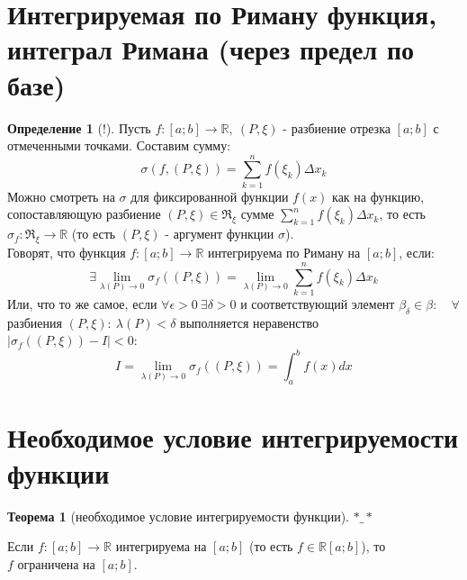 \documentclass{report}
\theoremstyle{definition}
\newtheorem*{definition}{Определение}
\newtheorem*{theorem}{Теорема}
\begin{document}
\section{Интегрируемая по Риману функция, интеграл Римана (через предел по базе)}

\begin{definition}[!]
    Пусть $f:[a;b]\rightarrow\mathbb{R}, \ (P,\xi)$ - разбиение отрезка $[a;b]$ с отмеченными точками. Составим сумму:
    \begin{equation*}
        \sigma(f,(P,\xi)) = \sum_{k=1}^{n}f(\xi_{k})\Delta x_{k}
    \end{equation*}
    Можно смотреть на $\sigma$ для фиксированной функции $f(x)$ как на функцию, сопоставляющую разбиение $(P,\xi)\in
        \Re_{\xi}$ сумме $\sum_{k=1}^{n}f(\xi_{k})\Delta x_{k}$, то есть $\sigma_{f}:\Re_{\xi}\rightarrow\mathbb{R}$
    (то есть $(P,\xi)$ - аргумент функции $\sigma$).\\

    Говорят, что функция $f:[a;b]\rightarrow\mathbb{R}$ интегрируема по Риману на $[a;b]$, если:
    \begin{equation*}
        \exists\underset{\lambda(P)\rightarrow0}{\lim}\sigma_{f}((P,\xi)) = \underset{\lambda(P)\rightarrow0}{\lim}
        \sum_{k=1}^{n}f(\xi_{k})\Delta x_{k}
    \end{equation*}
    Или, что то же самое, если $\forall\epsilon>0 \ \exists\delta>0$ и соответствующий элемент $\beta_{\delta} \in
        \beta:\quad \forall$ разбиения $(P,\xi): \ \lambda(P) < \delta$ выполняется неравенство \\ $| \sigma_{f}
        ((P,\xi)) - I | < 0$:
    \begin{equation*}
        I = \underset{\lambda(P)\rightarrow0}{\lim}\sigma_{f}((P,\xi)) = \int_{a}^{b}f(x)dx
    \end{equation*}
\end{definition}

\section{Необходимое условие интегрируемости функции}

\begin{theorem}[необходимое условие интегрируемости функции]
    $*\_*$

    Если $f:[a;b]\rightarrow\mathbb{R}$ интегрируема на $[a;b]$ (то есть $f\in\mathbb{R}[a;b]$), то \\ $f$
    ограничена на $[a;b]$.
\end{theorem}
\end{document}
